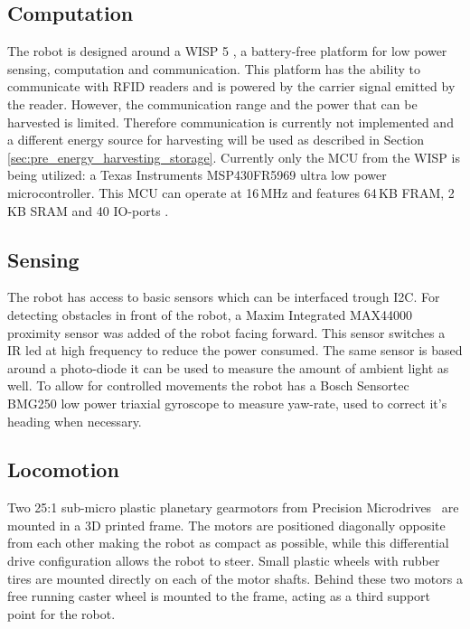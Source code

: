 \subsection{Computation}
\label{sec:dai_computation}

The robot is designed around a WISP 5 \cite{wisp5_wiki_2017}, a battery-free platform for low power sensing, computation and communication.
This platform has the ability to communicate with RFID readers and is powered by the carrier signal emitted by the reader.
However, the communication range and the power that can be harvested is limited.
Therefore communication is currently not implemented and a different energy source for harvesting will be used as described in Section \ref{sec:pre_energy_harvesting_storage}.
Currently only the MCU from the WISP is being utilized: a Texas Instruments MSP430FR5969 ultra low power microcontroller.
This MCU can operate at 16\,MHz and features 64\,KB FRAM, 2\,KB SRAM and 40 IO-ports \cite{msp430fr5969_2017}.

\subsection{Sensing}
\label{sec:dai_sensing}

The robot has access to basic sensors which can be interfaced trough I2C.
For detecting obstacles in front of the robot, a Maxim Integrated MAX44000 proximity sensor was added of the robot facing forward.
This sensor switches a IR led at high frequency to reduce the power consumed.
The same sensor is based around a photo-diode it can be used to measure the amount of ambient light as well.
To allow for controlled movements the robot has a Bosch Sensortec BMG250 low power triaxial gyroscope to measure yaw-rate, used to correct it's heading when necessary.

\subsection{Locomotion}


Two 25:1 sub-micro plastic planetary gearmotors from Precision Microdrives~\cite{gearmotor_206-110_2017} are mounted in a 3D printed frame.
The motors are positioned diagonally opposite from each other making the robot as compact as possible, while this differential drive configuration allows the robot to steer.
Small plastic wheels with rubber tires are mounted directly on each of the motor shafts.
Behind these two motors a free running caster wheel is mounted to the frame, acting as a third support point for the robot.

